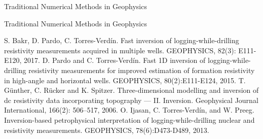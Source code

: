 \begin{frame}[t]{Traditional Numerical Methods in Geophysics}

\vspace{0.2cm} 

\end{frame}


\begin{frame}{Traditional Numerical Methods in Geophysics}
\begin{thebibliography}{1}
 \small{S. Bakr, D. Pardo, C. Torres-Verdín. Fast inversion of logging-while-drilling resistivity measurements
acquired in multiple wells. GEOPHYSICS, 82(3): E111-E120, 2017.}
\vspace{0.3cm}
 D. Pardo and C. Torres-Verdín. Fast 1D inversion of logging-while-drilling resistivity
measurements for improved estimation of formation
resistivity in high-angle and horizontal wells. GEOPHYSICS, 80(2):E111-E124, 2015.
\vspace{0.3cm}
 T. Günther,  C. Rücker and  K. Spitzer. Three-dimensional modelling and inversion of dc resistivity data incorporating topography — II. Inversion. Geophysical Journal International, 166(2): 506–517, 2006.
\vspace{0.3cm}
 O. Ijasan, C. Torres-Verdín, and W. Preeg. Inversion-based petrophysical interpretation of logging-while-drilling nuclear and resistivity measurements. GEOPHYSICS, 78(6):D473-D489, 2013.
\end{thebibliography}
\end{frame}



